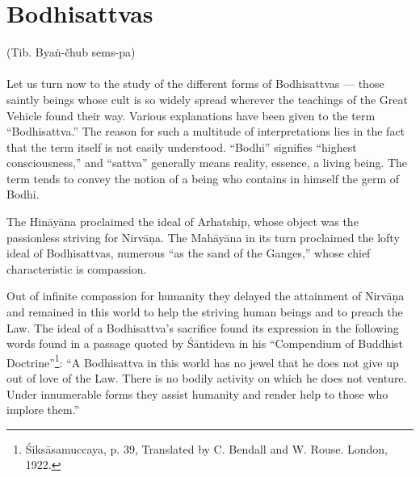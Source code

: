 \documentclass[a4paper, 12pt, oneside]{article}
\begin{document}
\clearpage
\section{Bodhisattvas}
\begin{center}
(Tib. Bya\.{n}-čhub sems-pa) 
\end{center}
\paragraph{}
Let us turn now to the study of the different forms of Bodhisattvas --- those saintly beings whose cult is so widely spread wherever the teachings of the Great Vehicle found their way. Various explanations have been given to the term ``Bodhisattva.'' The reason for such a multitude of interpretations lies in the fact that the term itself is not easily understood. ``Bodhi'' signifies ``highest consciousness,'' and ``sattva'' generally means reality, essence, a living being. The term tends to convey the notion of a being who contains in himself the germ of Bodhi.

The Hin\={a}y\={a}na proclaimed the ideal of Arhatship, whose object was the passionless striving for Nirv\={a}\d{n}a. The Mah\={a}y\={a}na in its turn proclaimed the lofty ideal of Bodhisattvas, numerous ``as the sand of the Ganges,'' whose chief characteristic is compassion.

Out of infinite compassion for humanity they delayed the attainment of Nirv\={a}\d{n}a and remained in this world to help the striving human beings and to preach the Law. The ideal of a Bodhisattva's sacrifice found its expression in the following words found in a passage quoted by \'{S}\={a}ntideva in his ``Compendium of Buddhist Doctrine''\footnote{\'{S}iks\={a}samuccaya, p. 39, Translated by C. Bendall and W. Rouse. London, 1922.}: ``A Bodhisattva in this world has no jewel that he does not give up out of love of the Law. There is no bodily activity on which he does not venture. Under innumerable forms they assist humanity and render help to those who implore them.''
\end{document}
